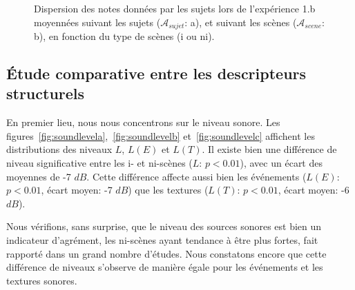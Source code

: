 \begin{figure}[t]
        \myfloatalign
       \caption{Dispersion des notes données par les sujets lors de l'expérience 1.b moyennées suivant les sujets ($\mathcal{A}_{sujet}$: a), et suivant les scènes ($\mathcal{A}_{scene}$: b), en fonction du type de scènes (i ou ni).}\label{fig:xp2_A}
\end{figure}
 
\subsection{Étude comparative entre les descripteurs structurels}

En premier lieu, nous nous concentrons sur le niveau sonore. Les figures~\ref{fig:soundlevela},~\ref{fig:soundlevelb} et~\ref{fig:soundlevelc} affichent les distributions des niveaux $L$, $L(E)$ et $L(T)$. Il existe bien une différence de niveau  significative entre les i- et ni-scènes ($L$: $p<0.01$), avec un écart des moyennes de -7 $dB$. Cette différence affecte aussi bien les événements ($L(E)$: $p<0.01$, écart moyen: -7 $dB$) que les textures ($L(T)$: $p<0.01$, écart moyen: -6 $dB$). 

Nous vérifions, sans surprise, que le niveau des sources sonores est bien un indicateur d'agrément, les ni-scènes ayant tendance à être plus fortes, fait rapporté dans un grand nombre d'études. Nous constatons encore que cette différence de niveaux s'observe de manière égale pour les événements et les textures sonores. 

